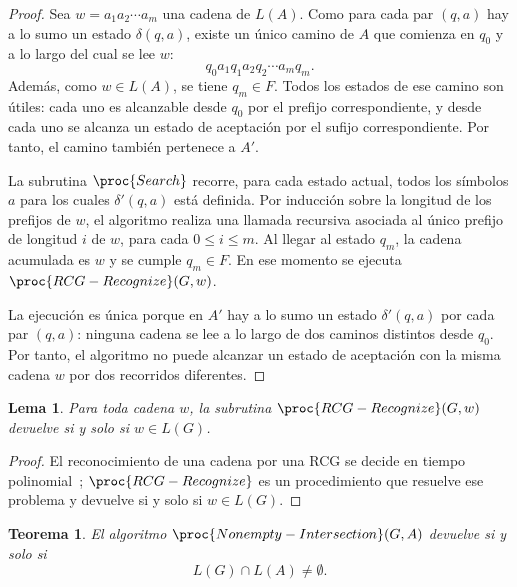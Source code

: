 \documentclass{report}
\theoremstyle{definition}
\theoremstyle{plain}
\newtheorem{teorema}{Teorema}[chapter]
\newtheorem{lema}{Lema}[chapter]
\theoremstyle{remark}
\begin{document}
\begin{proof}
  Sea $w=a_1a_2\cdots a_m$ una cadena de $L(A)$. Como para cada par
  $(q,a)$ hay a lo sumo un estado $\delta(q,a)$, existe un único camino de
  $A$ que comienza en $q_0$ y a lo largo del cual se lee $w$:
  \[
    q_0 a_1 q_1 a_2 q_2 \cdots a_m q_m.
  \]
  Además, como $w \in L(A)$, se tiene $q_m \in F$. Todos los estados de ese
  camino son útiles: cada uno es alcanzable desde $q_0$ por el prefijo
  correspondiente, y desde cada uno se alcanza un estado de aceptación
  por el
  sufijo correspondiente. Por tanto, el camino también pertenece a $A'$.

  La subrutina $\proc{Search}$ recorre, para cada estado actual, todos los
  símbolos $a$ para los cuales $\delta'(q,a)$ está definida. Por inducción
  sobre la longitud de los prefijos de $w$, el algoritmo realiza una
  llamada recursiva asociada al único prefijo de longitud $i$ de $w$, para
  cada $0 \le i \le m$. Al llegar al estado $q_m$, la cadena acumulada es
  $w$ y se cumple $q_m \in F$. En ese momento se ejecuta
  $\proc{RCG-Recognize}(G,w)$.

  La ejecución es única porque en $A'$ hay a lo sumo un estado
  $\delta'(q,a)$ por cada par $(q,a)$: ninguna cadena se lee a lo largo
  de dos caminos distintos desde $q_0$.
  Por tanto, el algoritmo no puede alcanzar un estado de aceptación con
  la misma
  cadena $w$ por dos recorridos diferentes.
\end{proof}

\begin{lema}
  \label{lema:correctitud-reconocedor}
  Para toda cadena $w$, la subrutina $\proc{RCG-Recognize}(G,w)$ devuelve
   si y solo si $w \in L(G)$.
\end{lema}

\begin{proof}
  El reconocimiento de una cadena por una RCG se decide en tiempo
  polinomial~\cite{bertsch2001rcg,kallmeyer2010parsing}; $\proc{RCG-Recognize}$
  es un procedimiento que resuelve ese problema y devuelve  si
  y solo si $w \in L(G)$.
\end{proof}

\begin{teorema}
  \label{teo:correctitud-enumeracion}
  El algoritmo $\proc{Nonempty-Intersection}(G,A)$ devuelve
   si y solo si
  \[
    L(G) \cap L(A) \neq \emptyset.
  \]
\end{teorema}
\end{document}
